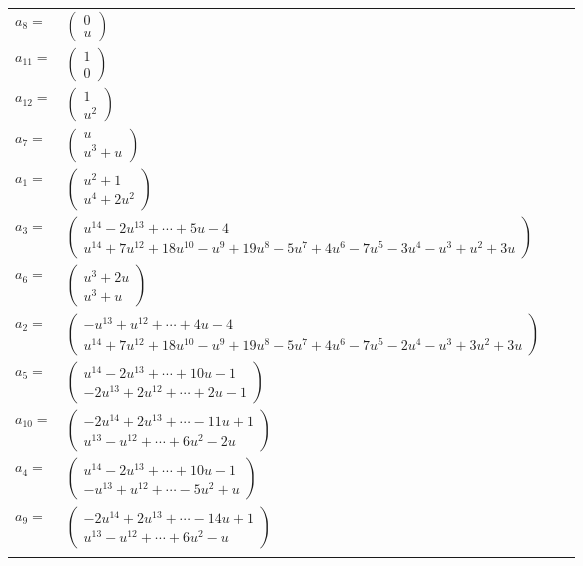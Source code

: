 \documentclass[1p]{elsarticle_modified}
\theoremstyle{definition}
\begin{document}
\begin{tabular}{m{7pt} m{180pt} m{7pt} m{180pt} }
\flushright $a_{8}=$&$\begin{pmatrix}0\\u\end{pmatrix}$ \\
\flushright $a_{11}=$&$\begin{pmatrix}1\\0\end{pmatrix}$ \\
\flushright $a_{12}=$&$\begin{pmatrix}1\\u^2\end{pmatrix}$ \\
\flushright $a_{7}=$&$\begin{pmatrix}u\\u^3+u\end{pmatrix}$ \\
\flushright $a_{1}=$&$\begin{pmatrix}u^2+1\\u^4+2 u^2\end{pmatrix}$ \\
\flushright $a_{3}=$&$\begin{pmatrix}u^{14}-2 u^{13}+\cdots+5 u-4\\u^{14}+7 u^{12}+18 u^{10}- u^9+19 u^8-5 u^7+4 u^6-7 u^5-3 u^4- u^3+u^2+3 u\end{pmatrix}$ \\
\flushright $a_{6}=$&$\begin{pmatrix}u^3+2 u\\u^3+u\end{pmatrix}$ \\
\flushright $a_{2}=$&$\begin{pmatrix}- u^{13}+u^{12}+\cdots+4 u-4\\u^{14}+7 u^{12}+18 u^{10}- u^9+19 u^8-5 u^7+4 u^6-7 u^5-2 u^4- u^3+3 u^2+3 u\end{pmatrix}$ \\
\flushright $a_{5}=$&$\begin{pmatrix}u^{14}-2 u^{13}+\cdots+10 u-1\\-2 u^{13}+2 u^{12}+\cdots+2 u-1\end{pmatrix}$ \\
\flushright $a_{10}=$&$\begin{pmatrix}-2 u^{14}+2 u^{13}+\cdots-11 u+1\\u^{13}- u^{12}+\cdots+6 u^2-2 u\end{pmatrix}$ \\
\flushright $a_{4}=$&$\begin{pmatrix}u^{14}-2 u^{13}+\cdots+10 u-1\\- u^{13}+u^{12}+\cdots-5 u^2+u\end{pmatrix}$ \\
\flushright $a_{9}=$&$\begin{pmatrix}-2 u^{14}+2 u^{13}+\cdots-14 u+1\\u^{13}- u^{12}+\cdots+6 u^2- u\end{pmatrix}$\\&\end{tabular}
\end{document}
